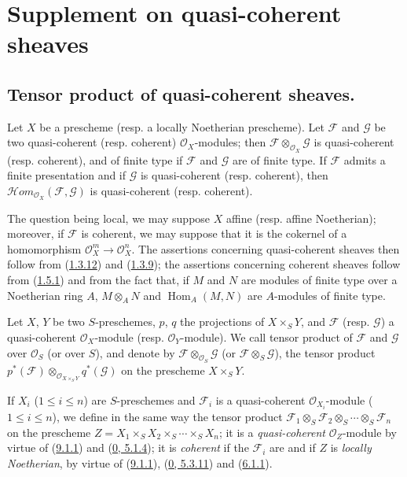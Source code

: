 \section{Supplement on quasi-coherent sheaves}
\label{section:I.9}

\subsection{Tensor product of quasi-coherent sheaves.}
\label{subsection:I.9.1}

\begin{proposition}[9.1.1]
\label{I.9.1.1}
Let $X$ be a prescheme (resp. a locally Noetherian prescheme). Let
$\mathscr{F}$ and $\mathscr{G}$ be two quasi-coherent (resp. coherent)
$\mathscr{O}_X$-modules; then
$\mathscr{F}\otimes_{\mathscr{O}_X}\mathscr{G}$ is quasi-coherent (resp.
coherent), and of finite type if $\mathscr{F}$ and $\mathscr{G}$ are of
finite type. If $\mathscr{F}$ admits a finite presentation and if
$\mathscr{G}$ is quasi-coherent (resp. coherent), then
$\mathscr{H}\!om_{\mathscr{O}_X}(\mathscr{F},\mathscr{G})$ is quasi-coherent
(resp. coherent).
\end{proposition}

The question being local, we may suppose $X$ affine (resp. affine
Noetherian); moreover, if $\mathscr{F}$ is coherent, we may suppose that it
is the cokernel of a homomorphism
$\mathscr{O}_X^m\to\mathscr{O}_X^n$. The assertions concerning quasi-coherent
sheaves then follow from
(\hyperref[I.1.3.12]{1.3.12}) and
(\hyperref[I.1.3.9]{1.3.9}); the assertions concerning coherent
sheaves follow from (\hyperref[I.1.5.1]{1.5.1}) and from the fact that, if
$M$ and $N$ are modules of finite type over a Noetherian ring $A$,
$M\otimes_A N$ and $\operatorname{Hom}_A(M,N)$ are $A$-modules of finite
type.

\begin{definition}[9.1.2]
\label{I.9.1.2}
Let $X$, $Y$ be two $S$-preschemes, $p$, $q$ the projections of
$X\times_S Y$, and $\mathscr{F}$ (resp. $\mathscr{G}$) a quasi-coherent
$\mathscr{O}_X$-module (resp. $\mathscr{O}_Y$-module). We call tensor
product of $\mathscr{F}$ and $\mathscr{G}$ over $\mathscr{O}_S$ (or over
$S$), and denote by
$\mathscr{F}\otimes_{\mathscr{O}_S}\mathscr{G}$ (or
$\mathscr{F}\otimes_S\mathscr{G}$), the tensor product
$p^*(\mathscr{F})\otimes_{\mathscr{O}_{X\times_S Y}}q^*(\mathscr{G})$ on the
prescheme $X\times_S Y$.
\end{definition}

If $X_i$ ($1\leq i\leq n$) are $S$-preschemes and $\mathscr{F}_i$ is a
quasi-coherent $\mathscr{O}_{X_i}$-module ($1\leq i\leq n$), we define in
the same way the tensor product
$\mathscr{F}_1\otimes_S\mathscr{F}_2\otimes_S\cdots\otimes_S\mathscr{F}_n$
on the prescheme
$Z=X_1\times_S X_2\times_S\cdots\times_S X_n$; it is a
\emph{quasi-coherent} $\mathscr{O}_Z$-module by virtue of
(\hyperref[I.9.1.1]{9.1.1}) and
(\hyperref[0.5.1.4]{0, 5.1.4}); it is \emph{coherent} if the
$\mathscr{F}_i$ are and if $Z$ is \emph{locally Noetherian}, by virtue
of (\hyperref[I.9.1.1]{9.1.1}),
(\hyperref[0.5.3.11]{0, 5.3.11}) and
(\hyperref[I.6.1.1]{6.1.1}).

